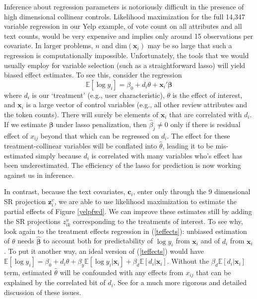 \documentclass[12pt]{article}
\newcommand{\bs}[1]{\boldsymbol{#1}}
\newcommand{\mr}[1]{\mathrm{#1}}
\newcommand{\bm}[1]{\mathbf{#1}}
\newcommand{\ds}[1]{\mathds{#1}}
\begin{document}
Inference about regression parameters is notoriously difficult in the presence of high dimensional collinear controls.  Likelihood maximization for the full 14,347
variable regression in our Yelp example, of vote count on all attributes and all text counts,  would be very expensive and implies only around 15 observations per covariate.  
In larger problems, $n$ and $\mr{dim}(\bm{x}_i)$ may be so large that such a regression is computationally impossible.
Unfortunately, the tools that we would usually employ for variable selection (such as a straightforward lasso) will yield biased effect estimates.  To see this, consider
the regression 
\begin{equation}\label{teffects}
\ds{E}[\log y_i] = \beta_0 + d_i\theta  + \bm{x}_i'\bs{\beta}
\end{equation}
where $d_i$ is our `treatment' (e.g., user characteristic), $\theta$ is
the effect of interest, and $\bm{x}_i$ is a large vector of control
variables (e.g., all other review attributes and the token counts).   There
will surely be elements of $\bm{x}_i$ that are correlated with $d_i$. If
we estimate $\bs{\beta}$ under lasso penalization, 
then $\hat\beta_j \neq 0$ only if there is 
residual effect of $x_{ij}$ beyond that which can be regressed on $d_i$.  The
 effect for these treatment-collinear variables will be conflated
into $\hat\theta$, leading it to be mis-estimated simply because $d_i$ is correlated with many
variables who's effect has been underestimated.  The efficiency of the lasso
for prediction is now working against us in inference.

In contrast, because the text covariates, $\bm{c}_i$, enter only through the 9
dimensional SR projection $\bm{z}^v_i$, we are able to use likelihood maximization
 to estimate the partial effects of Figure \ref{yelpfwd}.
We can improve these estimates still by adding the SR
projections $z^u_{ik}$ corresponding to the treatments of interest.    To see why, look
again to the treatment effects regression in (\ref{teffects}): 
unbiased estimation of $\theta$ needs $\bs{\hat\beta}$ to account both for
predictability of $\log y_i$ from $\bm{x}_i$ and of $d_i$ from $\bm{x}_i$.  To
put it another way, an ideal version of (\ref{teffects}) would have $\ds{E}[\log y_i] = \beta_0 + d_i\theta  + \beta_y \ds{E}[\log y_i
| \bm{x}_i] + \beta_d \ds{E}[d_i | \bm{x}_i]$.  Without the $\beta_d \ds{E}[d_i | \bm{x}_i]$ 
term, estimated $\hat\theta$ will be confounded with any effects from
$x_{ij}$ that can be explained by the correlated bit of $d_i$.  See
\citet{belloni_inference_2012} for a much more rigorous and detailed
discussion of these issues.
\end{document}
